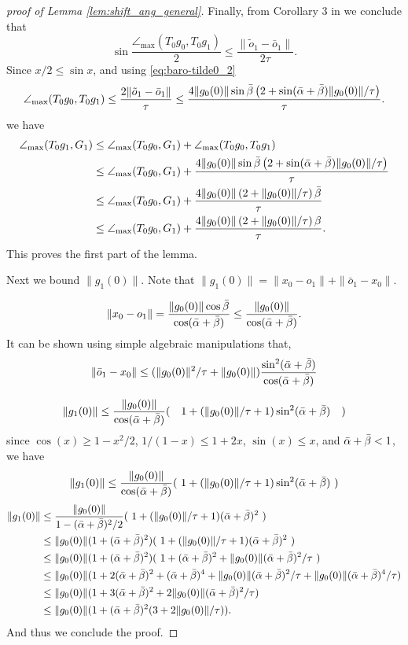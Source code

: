 \documentclass[12pt]{article}
\theoremstyle{remark}
\newcommand{\maxangle}{\angle_{\max}}
\begin{document}
\begin{appendices}
\begin{proof}[proof of Lemma \ref{lem:shift_ang_general}]
Finally, from Corollary 3 in \cite{boissonnat2017reach} we conclude that 
\[
\sin \frac{\maxangle(T_0g_0,T_0g_1)}{2} \leq \frac{\|\tilde o_1 - \bar o_1\|}{2\tau}.
\]
Since $x/2 \leq \sin x$, and using \eqref{eq:baro-tilde0_2}
\[
\maxangle(T_0g_0,T_0g_1) \leq \frac{2\|\tilde o_1 - \bar o_1\|}{\tau} \leq \frac{4\|g_0(0)\|\sin{\betae}\left(2+\sin(\alphae+\betae)\|g_0(0)\|/\tau  \right)}{\tau}. 
\]
we have  
\begin{align*}
\maxangle (T_0g_1, G_1) &\leq \maxangle (T_0g_0, G_1) + \maxangle(T_0g_0,T_0g_1)
\\&\leq 
\maxangle(T_0g_0,G_1)  + \frac{4\|g_0(0)\|\sin{\betae}\left(2+\sin(\alphae+\betae)\|g_0(0)\| /\tau \right)}{\tau}
\\&\leq 
\maxangle(T_0g_0,G_1)  + \frac{4\|g_0(0)\|\left(2+\|g_0(0)\|/\tau\right)\betae}{\tau}
\\&\leq 
\maxangle(T_0g_0,G_1)  + \frac{4\|g_0(0)\|\left(2+\|g_0(0)\|/\tau\right)\beta}{\tau}.
\end{align*}
This proves the first part of the lemma.

Next we bound $\|g_1(0)\|$. Note that 
$\|g_1(0)\| = \|x_0-o_1\| + \|\bar{o}_1 - x_0\|$.

\[
\|x_0-o_1\| = \frac{\|g_0(0)\| \cos\bar{\beta}}{\cos(\bar{\alpha}+\bar{\beta})} \leq \frac{\|g_0(0)\|}{\cos(\bar{\alpha}+\bar{\beta})}.
\]
It can be shown using simple algebraic manipulations that,
\[
\|\bar{o}_1 - x_0\| \leq (\|g_0(0)\|^2/\tau+\|g_0(0)\|)  \frac{\sin^2(\bar{\alpha}+\bar{\beta})}{\cos(\bar{\alpha}+\bar{\beta})}
\]

\[
\|g_1(0)\| \leq  \frac{\|g_0(0)\|}{\cos(\bar{\alpha}+\bar{\beta})} (~~~1 + (\|g_0(0)\|/\tau+1) \sin^2(\bar{\alpha}+\bar{\beta})~~~)
\]
since $\cos(x) \geq 1- x^2/2$, $1/(1-x) \leq 1+2x$, $\sin(x) \leq x$, and $\bar{\alpha}+\bar{\beta} <1$,  we have 
\[
\|g_1(0)\| \leq  \frac{\|g_0(0)\|}{\cos(\bar{\alpha}+\bar{\beta})} (~1 + (\|g_0(0)\|/\tau+1) \sin^2(\bar{\alpha}+\bar{\beta})~)
\]
\begin{align}
\|g_1(0)\| &\leq  \frac{\|g_0(0)\|}{1-(\bar{\alpha}+\bar{\beta})^2/2} (~1 + (\|g_0(0)\|/\tau+1) (\bar{\alpha}+\bar{\beta})^2~) 
\\&
\leq \|g_0(0)\|(1+(\bar{\alpha}+\bar{\beta})^2) (~1 + (\|g_0(0)\|/\tau+1) (\bar{\alpha}+\bar{\beta})^2~) 
\\&
\leq \|g_0(0)\|(1+(\bar{\alpha}+\bar{\beta})^2) (~1 + (\bar{\alpha}+\bar{\beta})^2 + \|g_0(0)\|(\bar{\alpha}+\bar{\beta})^2/\tau~) 
\\&
\leq \|g_0(0)\|(1+2(\bar{\alpha}+\bar{\beta})^2 + (\bar{\alpha}+\bar{\beta})^4 + \|g_0(0)\|(\bar{\alpha}+\bar{\beta})^2/\tau+\|g_0(0)\|(\bar{\alpha}+\bar{\beta})^4/\tau) 
\\&
\leq \|g_0(0)\|(1+3(\bar{\alpha}+\bar{\beta})^2 + 2\|g_0(0)\|(\bar{\alpha}+\bar{\beta})^2/\tau) 
\\&
\leq \|g_0(0)\|(1+(\bar{\alpha}+\bar{\beta})^2 (3+ 2\|g_0(0)\|/\tau) ).
\end{align}
And thus we conclude the proof.
\end{proof}





\end{appendices}
\end{document}
